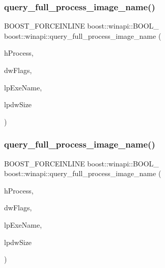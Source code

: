 \subsubsection{\texorpdfstring{query\+\_\+full\+\_\+process\+\_\+image\+\_\+name()}{query\_full\_process\_image\_name()}\hspace{0.1cm}{\footnotesize\ttfamily [1/2]}}
{\footnotesize\ttfamily B\+O\+O\+S\+T\+\_\+\+F\+O\+R\+C\+E\+I\+N\+L\+I\+NE boost\+::winapi\+::\+B\+O\+O\+L\+\_\+ boost\+::winapi\+::query\+\_\+full\+\_\+process\+\_\+image\+\_\+name (\begin{DoxyParamCaption}\item[{boost\+::winapi\+::\+H\+A\+N\+D\+L\+E\+\_\+}]{h\+Process,  }\item[{boost\+::winapi\+::\+D\+W\+O\+R\+D\+\_\+}]{dw\+Flags,  }\item[{boost\+::winapi\+::\+L\+P\+S\+T\+R\+\_\+}]{lp\+Exe\+Name,  }\item[{boost\+::winapi\+::\+P\+D\+W\+O\+R\+D\+\_\+}]{lpdw\+Size }\end{DoxyParamCaption})}

\mbox{\label{namespaceboost_1_1winapi_a42627a807148ac1d72e5eec95aacb3e7}} 
\subsubsection{\texorpdfstring{query\+\_\+full\+\_\+process\+\_\+image\+\_\+name()}{query\_full\_process\_image\_name()}\hspace{0.1cm}{\footnotesize\ttfamily [2/2]}}
{\footnotesize\ttfamily B\+O\+O\+S\+T\+\_\+\+F\+O\+R\+C\+E\+I\+N\+L\+I\+NE boost\+::winapi\+::\+B\+O\+O\+L\+\_\+ boost\+::winapi\+::query\+\_\+full\+\_\+process\+\_\+image\+\_\+name (\begin{DoxyParamCaption}\item[{boost\+::winapi\+::\+H\+A\+N\+D\+L\+E\+\_\+}]{h\+Process,  }\item[{boost\+::winapi\+::\+D\+W\+O\+R\+D\+\_\+}]{dw\+Flags,  }\item[{boost\+::winapi\+::\+L\+P\+W\+S\+T\+R\+\_\+}]{lp\+Exe\+Name,  }\item[{boost\+::winapi\+::\+P\+D\+W\+O\+R\+D\+\_\+}]{lpdw\+Size }\end{DoxyParamCaption})}



